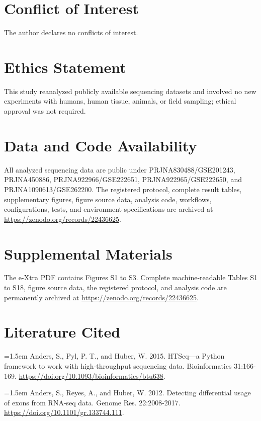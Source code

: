 \documentclass[12pt,letterpaper]{article}
\begin{document}
\section*{Conflict of Interest}

The author declares no conflicts of interest.

\section*{Ethics Statement}

This study reanalyzed publicly available sequencing datasets and involved no new experiments with humans, human tissue, animals, or field sampling; ethical approval was not required.

\section*{Data and Code Availability}

All analyzed sequencing data are public under PRJNA830488/GSE201243, PRJNA450886, PRJNA922966/GSE222651, PRJNA922965/GSE222650, and PRJNA1090613/GSE262200. The registered protocol, complete result tables, supplementary figures, figure source data, analysis code, workflows, configurations, tests, and environment specifications are archived at \url{https://zenodo.org/records/22436625}.

\section*{Supplemental Materials}

The e-Xtra PDF contains Figures S1 to S3. Complete machine-readable Tables S1 to S18, figure source data, the registered protocol, and analysis code are permanently archived at \url{https://zenodo.org/records/22436625}.

\clearpage\section*{Literature Cited}

\noindent\hangindent=1.5em Anders, S., Pyl, P. T., and Huber, W. 2015. HTSeq—a Python framework to work with high-throughput sequencing data. Bioinformatics 31:166-169. \url{https://doi.org/10.1093/bioinformatics/btu638}.\par

\noindent\hangindent=1.5em Anders, S., Reyes, A., and Huber, W. 2012. Detecting differential usage of exons from RNA-seq data. Genome Res. 22:2008-2017. \url{https://doi.org/10.1101/gr.133744.111}.\par
\end{document}
